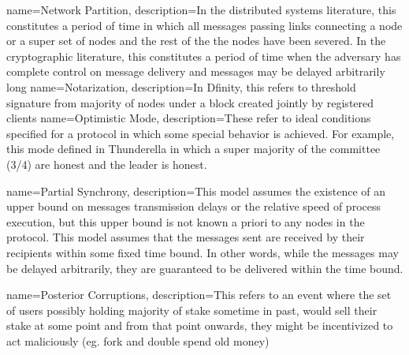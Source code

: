 \documentclass{article}
\begin{document}
{
    name=Network Partition,
    description={In the distributed systems literature, this constitutes a period of time in which all messages passing links connecting a node or a super set of nodes and the rest of the the nodes have been severed. In the cryptographic literature, this constitutes a period of time when the adversary has complete control on message delivery and messages may be delayed arbitrarily long \cite{AttiyaWelch}}
}
{
    name=Notarization,
    description={In Dfinity, this refers to threshold signature from majority of nodes under a block created jointly by registered clients \cite{Dfinity}}
}
{
    name=Optimistic Mode,
    description={These refer to ideal conditions specified for a protocol in which some special behavior is achieved. For example, this mode defined in Thunderella in which a super majority of the committee (3/4) are honest and the leader is honest. \cite{thunderella}}
}

{
    name=Partial Synchrony,
    description={This model assumes the existence of an upper bound on messages transmission delays or the relative speed of process execution, but this upper bound is not known a priori to any nodes in the protocol. This model assumes that the messages sent are received by their recipients within some fixed time bound. In other words, while the messages may be delayed arbitrarily, they are guaranteed to be delivered within the time bound. \cite{mahdiz}}
}

{
    name=Posterior Corruptions,
    description={This refers to an event where the set of users possibly holding majority of stake sometime in past, would sell their stake at some point and from that point onwards, they might be incentivized to act maliciously (eg. fork and double spend old money) \cite{thunderella}}
}

\end{document}
